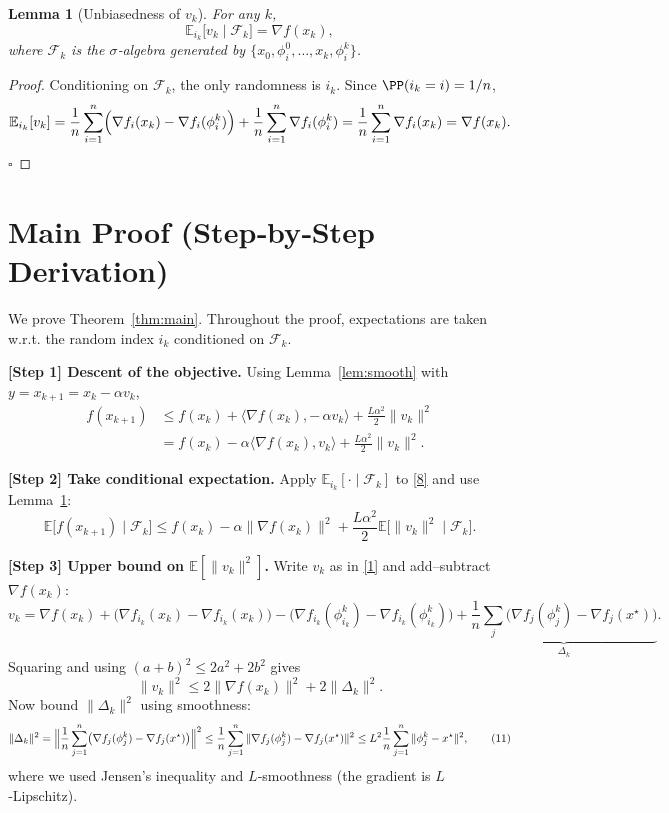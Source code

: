 \documentclass{article}
\newtheorem{lemma}{Lemma}
\newcommand{\EE}{\mathbb{E}}
\begin{document}
\begin{lemma}[Unbiasedness of $v_k$]\label{lem:unbiased}
For any $k$,
\[
\EE_{i_k}\bigl[v_k\mid \mathcal{F}_k\bigr]=\nabla f(x_k),
\tag{7}
\]
where $\mathcal{F}_k$ is the $\sigma$‑algebra generated by $\{x_0,\phi_i^{0},\dots,x_k,\phi_i^{k}\}$.
\end{lemma}
\begin{proof}
Conditioning on $\mathcal{F}_k$, the only randomness is $i_k$. Since $\PP(i_k=i)=1/n$,
\[
\EE_{i_k}[v_k]=\frac1n\sum_{i=1}^{n}\Bigl(\nabla f_i(x_k)-\nabla f_i(\phi_i^{k})\Bigr)+\frac1n\sum_{i=1}^{n}\nabla f_i(\phi_i^{k})
=\frac1n\sum_{i=1}^{n}\nabla f_i(x_k)=\nabla f(x_k).
\]
\hfill $\square$
\end{proof}

\section*{Main Proof (Step‑by‑Step Derivation)}
We prove Theorem~\ref{thm:main}. Throughout the proof, expectations are taken w.r.t. the random index $i_k$ conditioned on $\mathcal{F}_k$.

\bigskip
\noindent\textbf{[Step 1] Descent of the objective.}  
Using Lemma~\ref{lem:smooth} with $y=x_{k+1}=x_k-\alpha v_k$,
\[
\begin{aligned}
f(x_{k+1})
&\le f(x_k)+\langle\nabla f(x_k),-\,\alpha v_k\rangle
      +\frac{L\alpha^{2}}{2}\|v_k\|^{2}\\
&= f(x_k)-\alpha\langle\nabla f(x_k),v_k\rangle
   +\frac{L\alpha^{2}}{2}\|v_k\|^{2}. \tag{8}
\end{aligned}
\]

\noindent\textbf{[Step 2] Take conditional expectation.}  
Apply $\EE_{i_k}[\cdot\mid\mathcal{F}_k]$ to \eqref{8} and use Lemma~\ref{lem:unbiased}:
\[
\EE\!\bigl[f(x_{k+1})\mid\mathcal{F}_k\bigr]
\le f(x_k)-\alpha\|\nabla f(x_k)\|^{2}
   +\frac{L\alpha^{2}}{2}\EE\!\bigl[\|v_k\|^{2}\mid\mathcal{F}_k\bigr].
\tag{9}
\]

\noindent\textbf{[Step 3] Upper bound on $\EE[\|v_k\|^{2}]$.}  
Write $v_k$ as in \eqref{1} and add–subtract $\nabla f(x_k)$:
\[
v_k = \nabla f(x_k) + \bigl(\nabla f_{i_k}(x_k)-\nabla f_{i_k}(x_k)\bigr)
      -\bigl(\nabla f_{i_k}(\phi_{i_k}^{k})-\nabla f_{i_k}(\phi_{i_k}^{k})\bigr)
      +\underbrace{\frac1n\sum_{j}\bigl(\nabla f_j(\phi_j^{k})-\nabla f_j(x^{\star})\bigr)}_{\Delta_k}.
\]
Squaring and using $(a+b)^{2}\le 2a^{2}+2b^{2}$ gives
\[
\|v_k\|^{2}\le 2\|\nabla f(x_k)\|^{2}+2\|\Delta_k\|^{2}.
\tag{10}
\]
Now bound $\|\Delta_k\|^{2}$ using smoothness:
\[
\|\Delta_k\|^{2}
= \Bigl\|\frac1n\sum_{j=1}^{n}\bigl(\nabla f_j(\phi_j^{k})-\nabla f_j(x^{\star})\bigr)\Bigr\|^{2}
\le \frac1n\sum_{j=1}^{n}\|\nabla f_j(\phi_j^{k})-\nabla f_j(x^{\star})\|^{2}
\le L^{2}\frac1n\sum_{j=1}^{n}\|\phi_j^{k}-x^{\star}\|^{2},
\tag{11}
\]
where we used Jensen’s inequality and $L$‑smoothness (the gradient is $L$‑Lipschitz).
\end{document}
